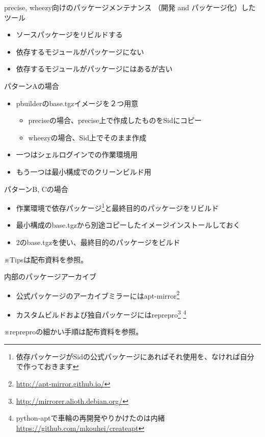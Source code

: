 \begin{frame}{precise, wheezy向けのパッケージメンテナンス}
（開発 and パッケージ化）したツール

\begin{itemize}
  \item[A) の] ソースパッケージをリビルドする
  \item[B) が] 依存するモジュールがパッケージにない
  \item[C) が] 依存するモジュールがパッケージにはあるが古い
\end{itemize}
\end{frame}

\begin{frame}{パターンAの場合}
\begin{itemize}
  \item pbuilderのbase.tgzイメージを２つ用意
    \begin{itemize}
      \item preciseの場合、precise上で作成したものをSidにコピー
      \item wheezyの場合、Sid上でそのまま作成
    \end{itemize}
  \item 一つはシェルログインでの作業環境用
  \item もう一つは最小構成でのクリーンビルド用
\end{itemize}
\end{frame}

\begin{frame}{パターンB, Cの場合}
\begin{itemize}
\item[1.] 作業環境で依存パッケージ\footnote{依存パッケージがSidの公式パッケージにあればそれ使用を、なければ自分で作っておきます}と最終目的のパッケージをリビルド
\item[2.] 最小構成のbase.tgzから別途コピーしたイメージインストールしておく
\item[3.] 2のbase.tgzを使い、最終目的のパッケージをビルド
\end{itemize}
※Tipsは配布資料を参照。
\end{frame}

\begin{frame}{内部のパッケージアーカイブ}
\begin{itemize}
\item 公式パッケージのアーカイブミラーにはapt-mirror\footnote{\url{http://apt-mirror.github.io/}}
\item カスタムビルドおよび独自パッケージにはreprepro\footnote{\url{http://mirrorer.alioth.debian.org/}} \footnote{python-aptで車輪の再開発やりかけたのは内緒 \url{https://github.com/mkouhei/createapt}}
\end{itemize}
※repreproの細かい手順は配布資料を参照。
\end{frame}

